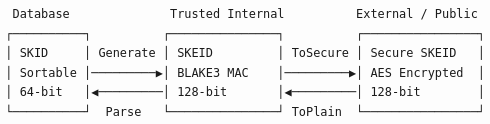 \documentclass[fleqn,10pt,lineno]{wlpeerj}
\begin{document}
\begin{verbatim}
   Database              Trusted Internal          External / Public
  ┌──────────┐          ┌───────────────┐          ┌────────────────┐
  │ SKID     │ Generate │ SKEID         │ ToSecure │ Secure SKEID   │
  │ Sortable │─────────▶│ BLAKE3 MAC    │─────────▶│ AES Encrypted  │
  │ 64-bit   │◀─────────│ 128-bit       │◀─────────│ 128-bit        │
  └──────────┘  Parse   └───────────────┘ ToPlain  └────────────────┘
\end{verbatim}
\end{document}
